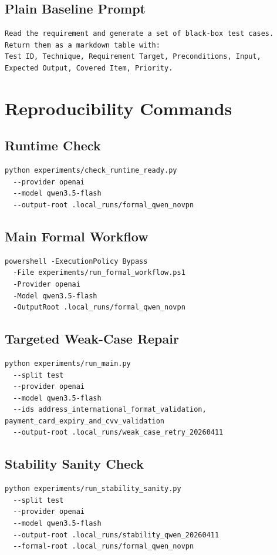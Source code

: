 \documentclass{article}
\begin{document}
\subsection{Plain Baseline Prompt}
\begin{verbatim}
Read the requirement and generate a set of black-box test cases.
Return them as a markdown table with:
Test ID, Technique, Requirement Target, Preconditions, Input,
Expected Output, Covered Item, Priority.
\end{verbatim}

\section{Reproducibility Commands}
\subsection{Runtime Check}
\begin{verbatim}
python experiments/check_runtime_ready.py
  --provider openai
  --model qwen3.5-flash
  --output-root .local_runs/formal_qwen_novpn
\end{verbatim}

\subsection{Main Formal Workflow}
\begin{verbatim}
powershell -ExecutionPolicy Bypass
  -File experiments/run_formal_workflow.ps1
  -Provider openai
  -Model qwen3.5-flash
  -OutputRoot .local_runs/formal_qwen_novpn
\end{verbatim}

\subsection{Targeted Weak-Case Repair}
\begin{verbatim}
python experiments/run_main.py
  --split test
  --provider openai
  --model qwen3.5-flash
  --ids address_international_format_validation,
payment_card_expiry_and_cvv_validation
  --output-root .local_runs/weak_case_retry_20260411
\end{verbatim}

\subsection{Stability Sanity Check}
\begin{verbatim}
python experiments/run_stability_sanity.py
  --split test
  --provider openai
  --model qwen3.5-flash
  --output-root .local_runs/stability_qwen_20260411
  --formal-root .local_runs/formal_qwen_novpn
\end{verbatim}
\end{document}
